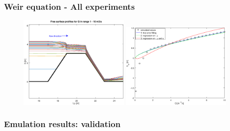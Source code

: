 \documentclass[xcolor=dvipsnames, USenglish]{beamer}  %
\begin{document}
  \begin{frame}
    \frametitle{Weir equation - All experiments}
      \begin{figure}[t]
        \includegraphics[width=0.48\textwidth]{img/free_surfaces_all.eps}
        \includegraphics[width=0.48\textwidth]{img/points_interpolations_all.eps}
      \end{figure}
  \end{frame}

  \begin{frame}
    \frametitle{Emulation results: validation}
    \begin{table}
    \centering
    \end{table}
  \end{frame}
\end{document}
